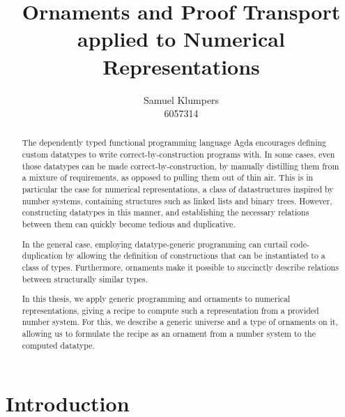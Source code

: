 \documentclass[10pt]{article}
\title{Ornaments and Proof Transport applied to Numerical Representations}
\author{Samuel Klumpers\\6057314}
\theoremstyle{plain}
\theoremstyle{definition}
\begin{document}
\maketitle

\begin{abstract}
The dependently typed functional programming language Agda encourages defining custom datatypes to write correct-by-construction programs with. In some cases, even those datatypes can be made correct-by-construction, by manually distilling them from a mixture of requirements, as opposed to pulling them out of thin air. This is in particular the case for numerical representations, a class of datastructures inspired by number systems, containing structures such as linked lists and binary trees. However, constructing datatypes in this manner, and establishing the necessary relations between them can quickly become tedious and duplicative.

In the general case, employing datatype-generic programming can curtail code-duplication by allowing the definition of constructions that can be instantiated to a class of types. Furthermore, ornaments make it possible to succinctly describe relations between structurally similar types.

In this thesis, we apply generic programming and ornaments to numerical representations, giving a recipe to compute such a representation from a provided number system.
For this, we describe a generic universe and a type of ornaments on it, allowing us to formulate the recipe as an ornament from a number system to the computed datatype.
\end{abstract}


\begin{comment}
This thesis explains the concepts numerical representations and ornaments, and aims to combine these to simplify the presentation and verification of finger trees. We demonstrate the generalizability and easier verification of the resulting code. Further, we also investigate to which extent descriptions and ornaments, and generic programs built on top of these, remain effective in a setting without axiom K.
\end{comment}
    

\tableofcontents

\listoftodos

\section{Introduction}\label{sec:introduction}

\end{document}
